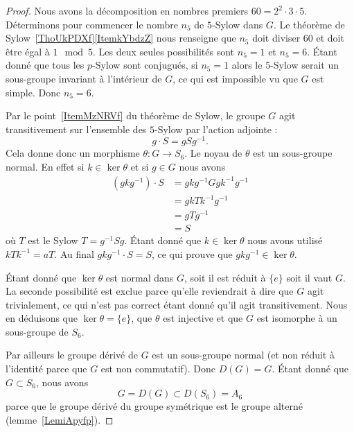 \begin{proof}
    Nous avons la décomposition en nombres premiers \( 60=2^2\cdot 3\cdot 5\). Déterminons pour commencer le nombre \( n_5\) de \( 5\)-Sylow dans \( G\). Le théorème de Sylow~\ref{ThoUkPDXf}\ref{ItemkYbdzZ} nous renseigne que \( n_5\) doit diviser \( 60\) et doit être égal à \( 1\mod 5\). Les deux seules possibilités sont \( n_5=1\) et \( n_5=6\). Étant donné que tous les \( p\)-Sylow sont conjugués, si \( n_5=1\) alors le \( 5\)-Sylow serait un sous-groupe invariant à l'intérieur de $G$, ce qui est impossible vu que \( G\) est simple. Donc \( n_5=6\).

    Par le point~\ref{ItemMzNRVf} du théorème de Sylow, le groupe \( G\) agit transitivement sur l'ensemble des \( 5\)-Sylow par l'action adjointe :
    \begin{equation}
        g\cdot S=gSg^{-1}.
    \end{equation}
    Cela donne donc un morphisme \( \theta\colon G\to S_6\). Le noyau de \( \theta\) est un sous-groupe normal. En effet si \( k\in \ker\theta\) et si \( g\in G\) nous avons
    \begin{subequations}
        \begin{align}
            (gkg^{-1})\cdot S&=gkg^{-1} Ggk^{-1}g^{-1}\\
            &=gkTk^{-1}g^{-1}\\
            &=gTg^{-1}\\
            &=S
        \end{align}
    \end{subequations}
    où \( T\) est le Sylow \( T=g^{-1}Sg\). Étant donné que \( k\in \ker\theta\) nous avons utilisé \( kTk^{-1}=aT\). Au final \( gkg^{-1}\cdot S=S\), ce qui prouve que \( gkg^{-1} \in\ker\theta\).

    Étant donné que \( \ker\theta\) est normal dans \( G\), soit il est réduit à \( \{ e \}\) soit il vaut \( G\). La seconde possibilité est exclue parce qu'elle reviendrait à dire que \( G\) agit trivialement, ce qui n'est pas correct étant donné qu'il agit transitivement. Nous en déduisons que \( \ker\theta=\{ e \}\), que \( \theta\) est injective et que \( G\) est isomorphe à un sous-groupe de \( S_6\).

    Par ailleurs le groupe dérivé de \( G\) est un sous-groupe normal (et non réduit à l'identité parce que \( G\) est non commutatif). Donc \( D(G)=G\). Étant donné que \( G\subset S_6\), nous avons
    \begin{equation}
        G=D(G)\subset D(S_6)=A_6
    \end{equation}
    parce que le groupe dérivé du groupe symétrique est le groupe alterné (lemme~\ref{LemiApyfp}).


\end{proof}
